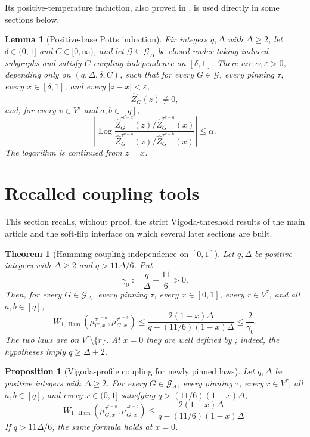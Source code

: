 \documentclass[11pt,reqno]{article}
\theoremstyle{plain}
\newtheorem{theorem}{Theorem}[section]
\newtheorem{proposition}[proposition]{Proposition}
\newtheorem{lemma}[lemma]{Lemma}
\theoremstyle{definition}
\theoremstyle{remark}
\newcommand{\eps}{\varepsilon}
\newcommand{\Log}{\operatorname{Log}}          %
\DeclareMathOperator{\Ham}{Ham}
\newcommand{\Deg}{\Delta}                        %
\newcommand{\WHam}{W_{1,\Ham}}                   %
\newcommand{\colours}{[q]}                        %
\newcommand{\Gdeg}{\mathcal{G}_{\Deg}}
\newcommand{\nZpin}[2]{\widehat Z_{#1}^{#2}}
\newcommand{\mupin}[3]{\mu_{#1,#3}^{#2}}
\newcommand{\gapq}{\gamma_0}
\begin{document}
Its positive-temperature induction, also proved in
\cite{ShaoShi2026CI2ZF}, is used directly in some sections below.

\begin{lemma}[Positive-base Potts induction]
\label{lem:potts-positive-response}
Fix integers \(q,\Deg\) with \(\Deg\ge2\), let \(\delta\in(0,1]\) and
\(C\in[0,\infty)\), and let
\(\mathcal G\subseteq\Gdeg\) be closed under taking induced subgraphs and satisfy
\(C\)-coupling independence on \([\delta,1]\).  There are
\(\alpha,\eps>0\), depending only on \((q,\Deg,\delta,C)\), such that for
every \(G\in\mathcal G\), every pinning \(\tau\), every
\(x\in[\delta,1]\), and every \(|z-x|<\eps\),
\[
  \nZpin{G}{\tau}(z)\ne0,
\]
and, for every \(v\in V^\tau\) and \(a,b\in\colours\),
\begin{equation}\label{eq:potts-response-invariant}
  \left|\Log
  \frac{\nZpin{G}{\tau^{v=a}}(z)/\nZpin{G}{\tau^{v=a}}(x)}
       {\nZpin{G}{\tau^{v=b}}(z)/\nZpin{G}{\tau^{v=b}}(x)}\right|
  \le\alpha.
\end{equation}
The logarithm is continued from \(z=x\).
\end{lemma}

\section{Recalled coupling tools}
\label{sec:recalled-tools}

This section recalls, without proof, the strict Vigoda-threshold results
of the main article \cite{ShaoShi2026CI2ZF} and the soft-flip interface
on which several later sections are built.

\begin{theorem}[Hamming coupling independence on \texorpdfstring{$[0,1]$}{[0,1]}]
\label{thm:strict-ci}
Let \(q,\Deg\) be positive integers with \(\Deg\ge2\) and
\(q>11\Deg/6\).  Put
\[
  \gapq:=\frac q\Deg-\frac{11}{6}>0.
\]
Then, for every \(G\in\Gdeg\), every pinning \(\tau\), every
\(x\in[0,1]\), every \(r\in V^\tau\), and all
\(a,b\in\colours\),
\[
  \WHam\!\left(
    \mupin{G}{\tau^{r=a}}{x},
    \mupin{G}{\tau^{r=b}}{x}
  \right)
  \le
  \frac{2(1-x)\Deg}{q-(11/6)(1-x)\Deg}
  \le\frac2{\gapq}.
\]
The two laws are on \(V^\tau\setminus\{r\}\).  At \(x=0\) they are
well defined by ; indeed, the hypotheses imply
\(q\ge\Deg+2\).
\end{theorem}

\begin{proposition}[Vigoda-profile coupling for newly pinned laws]
\label{prop:full-interval-hci}
Let \(q,\Deg\) be positive integers with \(\Deg\ge2\).  For every
\(G\in\Gdeg\), every pinning \(\tau\), every \(r\in V^\tau\), all
\(a,b\in\colours\), and every \(x\in(0,1]\) satisfying
\(q>(11/6)(1-x)\Deg\),
\begin{equation}\label{eq:vigoda-master-ci}
  \WHam\!\left(
    \mupin{G}{\tau^{r=a}}{x},\mupin{G}{\tau^{r=b}}{x}
  \right)
  \le\frac{2(1-x)\Deg}{q-(11/6)(1-x)\Deg}.
\end{equation}
If \(q>11\Deg/6\), the same formula holds at \(x=0\).
\end{proposition}
\end{document}
